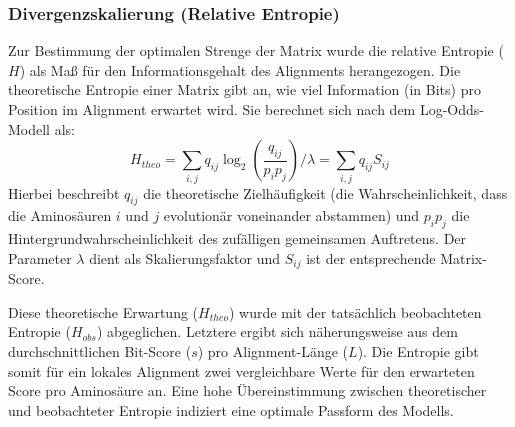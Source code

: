 \documentclass[11pt, a4paper]{article}
\begin{document}
\subsubsection{Divergenzskalierung (Relative Entropie)}
Zur Bestimmung der optimalen Strenge der Matrix wurde die relative Entropie ($H$) als Maß für den Informationsgehalt des Alignments herangezogen. 
Die theoretische Entropie einer Matrix gibt an, wie viel Information 
(in Bits) pro Position im Alignment erwartet wird. Sie berechnet sich nach dem Log-Odds-Modell als:
\begin{equation}
    H_{theo} = \sum_{i,j} q_{ij} \log_2\left(\frac{q_{ij}}{p_i p_j}\right) / \lambda = \sum_{i,j} q_{ij} S_{ij}
\end{equation}
Hierbei beschreibt $q_{ij}$ die theoretische Zielhäufigkeit (die Wahrscheinlichkeit, dass die Aminosäuren $i$ und $j$ evolutionär voneinander abstammen) und $p_i p_j$ die Hintergrundwahrscheinlichkeit des zufälligen gemeinsamen Auftretens. 
Der Parameter $\lambda$ dient als Skalierungsfaktor und $S_{ij}$ ist der entsprechende Matrix-Score.

Diese theoretische Erwartung ($H_{theo}$) wurde mit der tatsächlich beobachteten Entropie ($H_{obs}$) abgeglichen. 
Letztere ergibt sich näherungsweise aus dem durchschnittlichen Bit-Score ($s$) pro Alignment-Länge ($L$). Die Entropie gibt somit für ein lokales Alignment zwei vergleichbare Werte für den erwarteten Score pro Aminosäure an. Eine hohe Übereinstimmung zwischen theoretischer und beobachteter Entropie indiziert eine optimale Passform des Modells.
\end{document}
